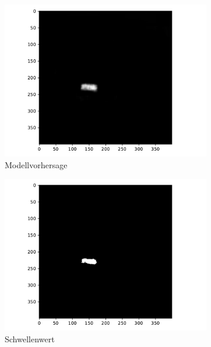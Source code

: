 \begin{figure}
    \begin{subfigure}{0.495\textwidth}
        \centering
        \includegraphics[width=\textwidth]{abbildungen/verarbeitung_1}
        \caption{Modellvorhersage}
    \end{subfigure}
    \begin{subfigure}{0.495\textwidth}
        \centering
        \includegraphics[width=\textwidth]{abbildungen/verarbeitung_2}
        \caption{Schwellenwert}
    \end{subfigure}
    \begin{subfigure}{0.495\textwidth}
        \centering

\end{subfigure}
\end{figure}
